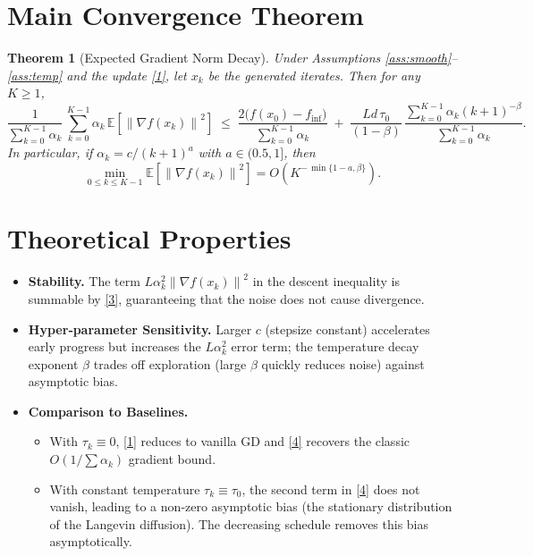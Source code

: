 \documentclass{article}
\newtheorem{theorem}{Theorem}
\newcommand{\E}{\mathbb{E}}
\newcommand{\norm}[1]{\left\|#1\right\|}
\begin{document}
\section*{Main Convergence Theorem}
\begin{theorem}[Expected Gradient Norm Decay]\label{thm:main}
Under Assumptions \ref{ass:smooth}–\ref{ass:temp} and the update \eqref{1}, let $x_{k}$ be the generated iterates. Then for any $K\ge1$,
\[
\frac{1}{\sum_{k=0}^{K-1}\alpha_{k}}\,
\sum_{k=0}^{K-1}\alpha_{k}\,\E\!\left[\norm{\nabla f(x_{k})}^{2}\right]
\;\le\;
\frac{2\bigl(f(x_{0})-f_{\inf}\bigr)}{\sum_{k=0}^{K-1}\alpha_{k}}
\;+\;
\frac{L d\,\tau_{0}}{(1-\beta)}\,
\frac{\sum_{k=0}^{K-1}\alpha_{k}(k+1)^{-\beta}}{\sum_{k=0}^{K-1}\alpha_{k}} .
\tag{4}
\]
In particular, if $\alpha_{k}=c/(k+1)^{a}$ with $a\in(0.5,1]$, then  
\[
\min_{0\le k\le K-1}\E\!\left[\norm{\nabla f(x_{k})}^{2}\right]
= O\!\left( K^{-\,\min\{1-a,\beta\}}\right).
\]
\end{theorem}

\section*{Theoretical Properties}
\begin{itemize}
  \item \textbf{Stability.} The term $L\alpha_{k}^{2}\norm{\nabla f(x_{k})}^{2}$ in the descent inequality is summable by \eqref{3}, guaranteeing that the noise does not cause divergence.
  \item \textbf{Hyper‑parameter Sensitivity.} Larger $c$ (stepsize constant) accelerates early progress but increases the $L\alpha_{k}^{2}$ error term; the temperature decay exponent $\beta$ trades off exploration (large $\beta$ quickly reduces noise) against asymptotic bias.
  \item \textbf{Comparison to Baselines.}
    \begin{itemize}
      \item With $\tau_{k}\equiv0$, \eqref{1} reduces to vanilla GD and \eqref{4} recovers the classic $O(1/\sum\alpha_{k})$ gradient bound.
      \item With constant temperature $\tau_{k}\equiv\tau_{0}$, the second term in \eqref{4} does not vanish, leading to a non‑zero asymptotic bias (the stationary distribution of the Langevin diffusion). The decreasing schedule removes this bias asymptotically.
    \end{itemize}
\end{itemize}
\end{document}
